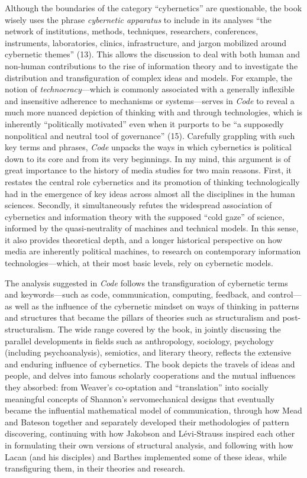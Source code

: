 \documentclass{tufte-handout}
\begin{document}
Although the boundaries of the category ``cybernetics'' are
questionable, the book wisely uses the phrase \emph{cybernetic
apparatus} to include in its analyses ``the network of institutions,
methods, techniques, researchers, conferences, instruments,
laboratories, clinics, infrastructure, and jargon mobilized around
cybernetic themes'' (13). This allows the discussion to deal with both
human and non-human contributions to the rise of information theory and
to investigate the distribution and transfiguration of complex ideas and
models. For example, the notion of \emph{technocracy}---which is
commonly associated with a generally inflexible and insensitive
adherence to mechanisms or systems---serves in \emph{Code} to reveal a
much more nuanced depiction of thinking with and through technologies,
which is inherently ``politically motivated'' even when it purports to
be ``a supposedly nonpolitical and neutral tool of governance'' (15).
Carefully grappling with such key terms and phrases, \emph{Code} unpacks
the ways in which cybernetics is political down to its core and from its
very beginnings. In my mind, this argument is of great importance to the
history of media studies for two main reasons. First, it restates the
central role cybernetics and its promotion of thinking technologically
had in the emergence of key ideas across almost all the disciplines in
the human sciences. Secondly, it simultaneously refutes the widespread
association of cybernetics and information theory with the supposed
``cold gaze'' of science, informed by the quasi-neutrality of machines
and technical models. In this sense, it also provides theoretical depth,
and a longer historical perspective on how media are inherently
political machines, to research on contemporary information
technologies---which, at their most basic levels, rely on cybernetic
models.

The analysis suggested in \emph{Code} follows the transfiguration of
cybernetic terms and keywords---such as code, communication, computing,
feedback, and control---as well as the influence of the cybernetic
mindset on ways of thinking in patterns and structures that became the
pillars of theories such as structuralism and post-structuralism. The
wide range covered by the book, in jointly discussing the parallel
developments in fields such as anthropology, sociology, psychology
(including psychoanalysis), semiotics, and literary theory, reflects the
extensive and enduring influence of cybernetics. The book depicts the
travels of ideas and people, and delves into famous scholarly
cooperations and the mutual influences they absorbed: from Weaver's
co-optation and ``translation'' into socially meaningful concepts of
Shannon's servomechanical designs that eventually became the influential
mathematical model of communication, through how Mead and Bateson
together and separately developed their methodologies of pattern
discovering, continuing with how Jakobson and Lévi-Strauss inspired each
other in formulating their own versions of structural analysis, and
following with how Lacan (and his disciples) and Barthes implemented
some of these ideas, while transfiguring them, in their theories and
research.
\end{document}
